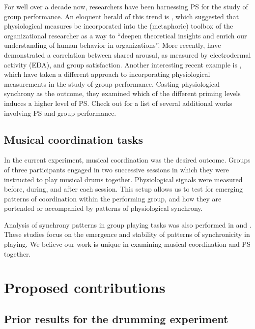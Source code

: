 \documentclass[a4paper, 11pt]{report}      %
\begin{document}
For well over a decade now, researchers have been harnessing PS for the study of group performance. An eloquent herald of this trend is \citet{akinola2010measuring}, which suggested that physiological measures be incorporated into the (metaphoric) toolbox of the organizational researcher as a way to \enquote{deepen theoretical insights and enrich our understanding of human behavior in organizations}. More recently,  \citet{chikersal2017deep} have demonstrated a correlation between shared arousal, as measured by electrodermal activity (EDA), and group satisfaction. Another interesting recent example is \citet{danyluck2018intergroup}, which have taken a different approach to incorporating physiological measurements in the study of group performance. Casting physiological synchrony as the outcome, they examined which of the different priming levels induces a higher level of PS. Check out \citet{jar202physiological} for a list of several additional works involving PS and group performance.

\section{Musical coordination tasks}
In the current experiment, musical coordination was the desired outcome. Groups of three participants engaged in two successive sessions in which they were instructed to play musical drums together. Physiological signals were measured before, during, and after each session\footnotemark. 
This setup allows us to test for emerging patterns of coordination within the performing group, and how they are portended or accompanied by patterns of physiological synchrony.

Analysis of synchrony patterns in group playing tasks was also performed in  \cite{abp2017symmetry} and \cite{shahal2020synchronization}. These studies focus on the emergence and stability of patterns of synchronicity in playing. We believe our work is unique in examining musical coordination and PS together.

\chapter{Proposed contributions}

\section{Prior results for the drumming experiment}
\end{document}
